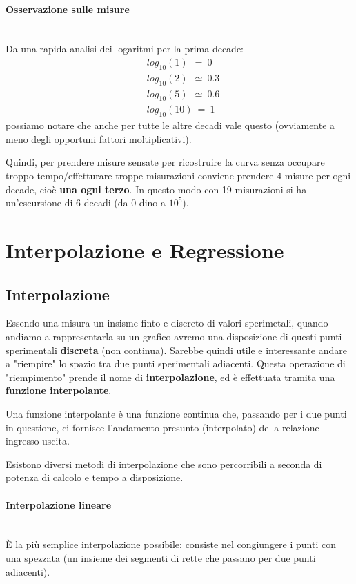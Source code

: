 \documentclass[a4paper,11pt]{report}
\begin{document}
\paragraph{Osservazione sulle misure}~\\
Da una rapida analisi dei logaritmi per la prima decade:
\begin{align*}
&log_{10}(1)~~ = ~0\\
&log_{10}(2)~~ \simeq~ 0.3\\
&log_{10}(5)~~ \simeq~ 0.6\\
&log_{10}(10)~ =~ 1
\end{align*}
possiamo notare che anche per tutte le altre decadi vale questo (ovviamente a meno degli opportuni fattori moltiplicativi).

Quindi, per prendere misure sensate per ricostruire la curva senza occupare troppo tempo/effetturare troppe misurazioni conviene prendere 4 misure per ogni decade, cioè \textbf{una ogni terzo}. In questo modo con 19 misurazioni si ha un'escursione di 6 decadi (da 0 dino a $10^5$). 
\section{Interpolazione e Regressione}
\subsection{Interpolazione}
Essendo una misura un insisme finto e discreto di valori sperimetali, quando andiamo a rappresentarla su un grafico avremo una disposizione di questi punti sperimentali \textbf{discreta} (non continua). Sarebbe quindi utile e interessante andare a "riempire" lo spazio tra due punti sperimentali adiacenti. Questa operazione di "riempimento" prende il nome di \textbf{interpolazione}, ed è effettuata tramita una \textbf{funzione interpolante}.

Una funzione interpolante è una funzione continua che, passando per i due punti in questione, ci fornisce l'andamento presunto (interpolato) della relazione ingresso-uscita.

Esistono diversi metodi di interpolazione che sono percorribili a seconda di potenza di calcolo e tempo a disposizione.
\paragraph{Interpolazione lineare}~\\
È la più semplice interpolazione possibile: consiste nel congiungere i punti con una spezzata (un insieme dei segmenti di rette che passano per due punti adiacenti).
\end{document}

